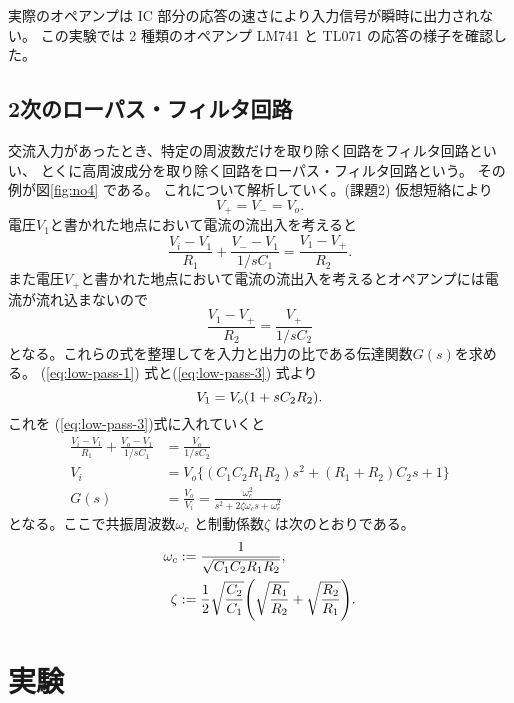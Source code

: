 \documentclass[11pt,dvipdfmx,a4paper]{jsarticle}
\begin{document}
実際のオペアンプは IC 部分の応答の速さにより入力信号が瞬時に出力されない。
この実験では 2 種類のオペアンプ LM741 と TL071 の応答の様子を確認した。


\subsection{2次のローパス・フィルタ回路}

交流入力があったとき、特定の周波数だけを取り除く回路をフィルタ回路といい、
とくに高周波成分を取り除く回路をローパス・フィルタ回路という。
その例が図\ref{fig:no4} である。
これについて解析していく。(課題2)
仮想短絡により
\begin{equation}
	V_{+} = V_{-} = V_o. \label{eq:low-pass-1}
\end{equation}
電圧\(V_1\)と書かれた地点において電流の流出入を考えると
\begin{equation}
	\frac{V_i-V_1}{R_1}+\frac{V_{-}-V_1}{1/sC_1} = \frac{V_1-V_{+}}{R_2} \label{eq:low-pass-2}.
\end{equation}
また電圧\(V_{+}\)と書かれた地点において電流の流出入を考えるとオペアンプには電流が流れ込まないので
\begin{equation}
	\frac{V_1-V_{+}}{R_2} = \frac{V_{+}}{1/sC_2} \label{eq:low-pass-3}
\end{equation}
となる。これらの式を整理してを入力と出力の比である伝達関数\(G(s)\)を求める。
(\ref{eq:low-pass-1}) 式と(\ref{eq:low-pass-3}) 式より
\begin{equation}
	V_1 = V_o \qty(1+sC_2 R_2).
\end{equation}
これを (\ref{eq:low-pass-3})式に入れていくと
\begin{align}
	\frac{V_i-V_1}{R_1}+\frac{V_{o}-V_1}{1/sC_1} &= \frac{V_{o}}{1/sC_2}\\
	V_i &= V_o \biggl\{(C_1C_2R_1R_2)s^2+(R_1+R_2)C_2s+1\biggr\}\\
	G(s) &= \frac{V_o}{V_i} = \frac{\omega_c^2}{s^2+2\zeta\omega_c s+\omega_c^2} \label{eq:low-pass-4}
\end{align}
となる。ここで共振周波数\(\omega_c\) と制動係数\(\zeta\) は次のとおりである。
\begin{align}
	\omega_c &:= \frac{1}{\sqrt{C_1C_2R_1R_2}},\\
	\zeta &:= \frac{1}{2}\sqrt{\frac{C_2}{C_1}}\qty(\sqrt{\frac{R_1}{R_2}}+\sqrt{\frac{R_2}{R_1}}).
\end{align}

\section{実験}
\end{document}

